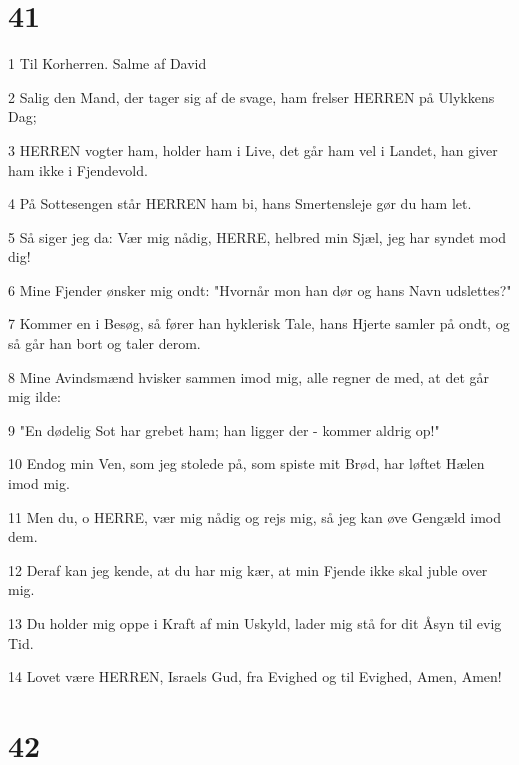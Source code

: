 \chapter{41}

\par 1 Til Korherren. Salme af David
\par 2 Salig den Mand, der tager sig af de svage, ham frelser HERREN på Ulykkens Dag;
\par 3 HERREN vogter ham, holder ham i Live, det går ham vel i Landet, han giver ham ikke i Fjendevold.
\par 4 På Sottesengen står HERREN ham bi, hans Smertensleje gør du ham let.
\par 5 Så siger jeg da: Vær mig nådig, HERRE, helbred min Sjæl, jeg har syndet mod dig!
\par 6 Mine Fjender ønsker mig ondt: "Hvornår mon han dør og hans Navn udslettes?"
\par 7 Kommer en i Besøg, så fører han hyklerisk Tale, hans Hjerte samler på ondt, og så går han bort og taler derom.
\par 8 Mine Avindsmænd hvisker sammen imod mig, alle regner de med, at det går mig ilde:
\par 9 "En dødelig Sot har grebet ham; han ligger der - kommer aldrig op!"
\par 10 Endog min Ven, som jeg stolede på, som spiste mit Brød, har løftet Hælen imod mig.
\par 11 Men du, o HERRE, vær mig nådig og rejs mig, så jeg kan øve Gengæld imod dem.
\par 12 Deraf kan jeg kende, at du har mig kær, at min Fjende ikke skal juble over mig.
\par 13 Du holder mig oppe i Kraft af min Uskyld, lader mig stå for dit Åsyn til evig Tid.
\par 14 Lovet være HERREN, Israels Gud, fra Evighed og til Evighed, Amen, Amen!

\chapter{42}

